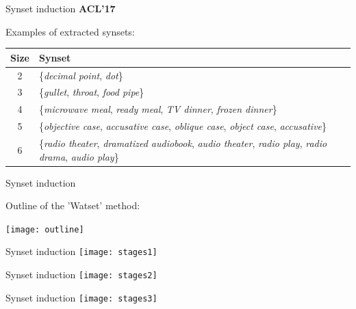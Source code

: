 

\begin{frame}{Synset induction}
	\textbf{ACL'17}~\cite{ustalov-panchenko-biemann:2017:Long}
	
	
\vspace{1em}
Examples of extracted synsets:
\vspace{1em}
\centering
\begin{tabular}{c|p{9cm}}
\textbf{Size} & \textbf{Synset}\\\hline
2 & \{\textit{decimal point}, \textit{dot}\}\\
3 & \{\textit{gullet}, \textit{throat}, \textit{food pipe}\}\\
4 & \{\textit{microwave meal}, \textit{ready meal}, \textit{TV dinner}, \textit{frozen dinner}\}\\
5 & \{\textit{objective case}, \textit{accusative case}, \textit{oblique case}, \textit{object case}, \textit{accusative}\}\\
6 & \{\textit{radio theater}, \textit{dramatized audiobook}, \textit{audio theater}, \textit{radio play}, \textit{radio drama}, \textit{audio play}\}\\
\end{tabular}


	
	
\end{frame}


\begin{frame}{Synset induction}
	
	
Outline of the 'Watset' method:

\vspace{2em}

\centering\texttt{[image: outline]}
	
\end{frame}


\begin{frame}{Synset induction}
\centering\texttt{[image: stages1]}	
\end{frame}



\begin{frame}{Synset induction}
\centering\texttt{[image: stages2]}	
\end{frame}



\begin{frame}{Synset induction}
\centering\texttt{[image: stages3]}	
\end{frame}


